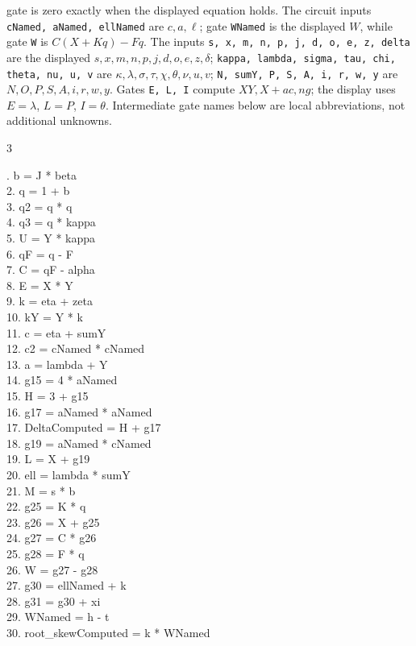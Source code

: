\documentclass[10pt]{article}
\begin{document}
gate is zero exactly when the displayed equation holds. The circuit inputs
\texttt{cNamed, aNamed, ellNamed} are $c,a,\ell$; gate \texttt{WNamed} is the
displayed $W$, while gate \texttt{W} is $C(X+Kq)-Fq$. The inputs
\texttt{s, x, m, n, p, j, d, o, e, z, delta} are the displayed
$s,x,m,n,p,j,d,o,e,z,\delta$; \texttt{kappa, lambda, sigma, tau, chi, theta, nu, u, v}
are $\kappa,\lambda,\sigma,\tau,\chi,\theta,\nu,u,v$; \texttt{N, sumY, P, S, A, i, r, w, y}
are $N,O,P,S,A,i,r,w,y$. Gates \texttt{E, L, I} compute $XY,X+ac,ng$;
the display uses $E=\lambda$, $L=P$, $I=\theta$. Intermediate gate
names below are local abbreviations, not additional unknowns.
\begin{multicols}{3}
\raggedright\ttfamily\fontsize{6.5}{7.3}. b = J * beta\\
2. q = 1 + b\\
3. q2 = q * q\\
4. q3 = q * kappa\\
5. U = Y * kappa\\
6. qF = q - F\\
7. C = qF - alpha\\
8. E = X * Y\\
9. k = eta + zeta\\
10. kY = Y * k\\
11. c = eta + sumY\\
12. c2 = cNamed * cNamed\\
13. a = lambda + Y\\
14. g15 = 4 * aNamed\\
15. H = 3 + g15\\
16. g17 = aNamed * aNamed\\
17. DeltaComputed = H + g17\\
18. g19 = aNamed * cNamed\\
19. L = X + g19\\
20. ell = lambda * sumY\\
21. M = s * b\\
22. g25 = K * q\\
23. g26 = X + g25\\
24. g27 = C * g26\\
25. g28 = F * q\\
26. W = g27 - g28\\
27. g30 = ellNamed + k\\
28. g31 = g30 + xi\\
29. WNamed = h - t\\
30. root\_skewComputed = k * WNamed\\

\end{multicols}
\end{document}
